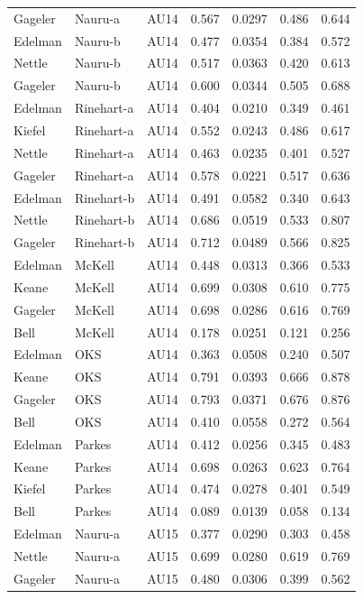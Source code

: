 \documentclass{monashthesis}
\begin{document}
\begin{center}
\begin{longtable}{lllllll}
Gageler & Nauru-a & AU14 & 0.567 & 0.0297 & 0.486 & 0.644 \\
Edelman & Nauru-b & AU14 & 0.477 & 0.0354 & 0.384 & 0.572 \\
Nettle & Nauru-b & AU14 & 0.517 & 0.0363 & 0.420 & 0.613 \\
Gageler & Nauru-b & AU14 & 0.600 & 0.0344 & 0.505 & 0.688 \\
Edelman & Rinehart-a & AU14 & 0.404 & 0.0210 & 0.349 & 0.461 \\
Kiefel & Rinehart-a & AU14 & 0.552 & 0.0243 & 0.486 & 0.617 \\
Nettle & Rinehart-a & AU14 & 0.463 & 0.0235 & 0.401 & 0.527 \\
Gageler & Rinehart-a & AU14 & 0.578 & 0.0221 & 0.517 & 0.636 \\
Edelman & Rinehart-b & AU14 & 0.491 & 0.0582 & 0.340 & 0.643 \\
Nettle & Rinehart-b & AU14 & 0.686 & 0.0519 & 0.533 & 0.807 \\
Gageler & Rinehart-b & AU14 & 0.712 & 0.0489 & 0.566 & 0.825 \\
Edelman & McKell & AU14 & 0.448 & 0.0313 & 0.366 & 0.533 \\
Keane & McKell & AU14 & 0.699 & 0.0308 & 0.610 & 0.775 \\
Gageler & McKell & AU14 & 0.698 & 0.0286 & 0.616 & 0.769 \\
Bell & McKell & AU14 & 0.178 & 0.0251 & 0.121 & 0.256 \\
Edelman & OKS & AU14 & 0.363 & 0.0508 & 0.240 & 0.507 \\
Keane & OKS & AU14 & 0.791 & 0.0393 & 0.666 & 0.878 \\
Gageler & OKS & AU14 & 0.793 & 0.0371 & 0.676 & 0.876 \\
Bell & OKS & AU14 & 0.410 & 0.0558 & 0.272 & 0.564 \\
Edelman & Parkes & AU14 & 0.412 & 0.0256 & 0.345 & 0.483 \\
Keane & Parkes & AU14 & 0.698 & 0.0263 & 0.623 & 0.764 \\
Kiefel & Parkes & AU14 & 0.474 & 0.0278 & 0.401 & 0.549 \\
Bell & Parkes & AU14 & 0.089 & 0.0139 & 0.058 & 0.134 \\
Edelman & Nauru-a & AU15 & 0.377 & 0.0290 & 0.303 & 0.458 \\
Nettle & Nauru-a & AU15 & 0.699 & 0.0280 & 0.619 & 0.769 \\
Gageler & Nauru-a & AU15 & 0.480 & 0.0306 & 0.399 & 0.562 \\

\end{longtable}
\end{center}
\end{document}
